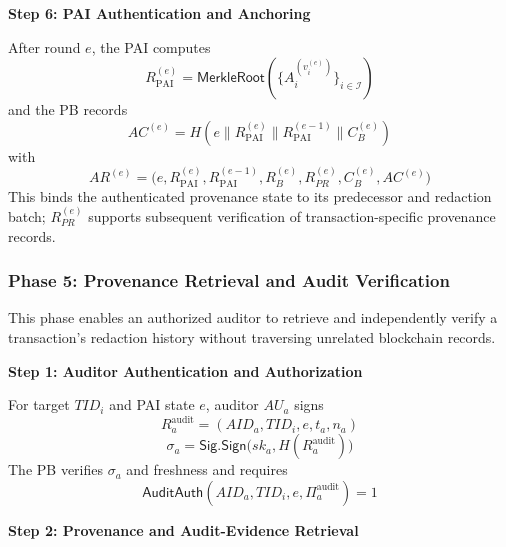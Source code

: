 \documentclass[lettersize,journal]{IEEEtran}
\begin{document}
\smallskip
\noindent\textbf{Step 6: PAI Authentication and Anchoring}

After round $e$, the PAI computes
\begin{equation}
R_{\mathrm{PAI}}^{(e)}
=
\mathsf{MerkleRoot}
\left(
\{A_i^{(v_i^{(e)})}\}_{i\in\mathcal I}
\right)
\label{eq:pai-root}
\end{equation}
and the PB records
\begin{equation}
AC^{(e)}
=
H\!\left(
e\parallel R_{\mathrm{PAI}}^{(e)}
\parallel R_{\mathrm{PAI}}^{(e-1)}
\parallel C_B^{(e)}
\right)
\label{eq:pai-anchor}
\end{equation}
with
\begin{equation}
AR^{(e)}
=
\big(
e,R_{\mathrm{PAI}}^{(e)},R_{\mathrm{PAI}}^{(e-1)},
R_B^{(e)},R_{PR}^{(e)},C_B^{(e)},AC^{(e)}
\big)
\label{eq:anchor-record}
\end{equation}
This binds the authenticated provenance state to its predecessor and
redaction batch; $R_{PR}^{(e)}$ supports subsequent verification of
transaction-specific provenance records.
\medskip


\subsubsection*{\textbf{Phase 5: Provenance Retrieval and Audit Verification}}
\label{sec:phase5}

This phase enables an authorized auditor to retrieve and independently
verify a transaction's redaction history without traversing unrelated
blockchain records.

\smallskip
\noindent\textbf{Step 1: Auditor Authentication and Authorization}

For target $TID_i$ and PAI state $e$, auditor $AU_a$ signs
\begin{equation}
R_a^{\mathrm{audit}} = (AID_a, TID_i, e, t_a, n_a)
\end{equation}
\begin{equation}
\sigma_a = \mathsf{Sig.Sign}\big(sk_a, H(R_a^{\mathrm{audit}})\big)
\end{equation}
The PB verifies $\sigma_a$ and freshness and requires
\begin{equation}
\mathsf{AuditAuth}(AID_a, TID_i, e, \Pi_a^{\mathrm{audit}}) = 1
\label{eq:auditor-authorization}
\end{equation}

\smallskip
\noindent\textbf{Step 2: Provenance and Audit-Evidence Retrieval}
\end{document}
